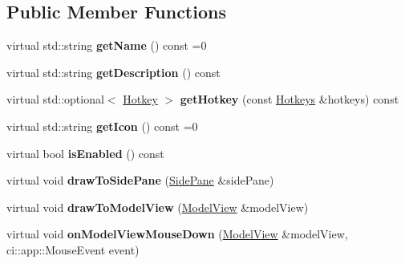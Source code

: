 \subsection*{Public Member Functions}
\begin{DoxyCompactItemize}
\item 
\mbox{\label{classpepr3d_1_1_tool_a5706faac1c122203317c60b3eb231d1a}} 
virtual std\+::string {\bfseries get\+Name} () const =0
\item 
\mbox{\label{classpepr3d_1_1_tool_a331bbb48707ea07c472b7634b02e1a18}} 
virtual std\+::string {\bfseries get\+Description} () const
\item 
\mbox{\label{classpepr3d_1_1_tool_a2b3b7279f6a942a99c11c9495b3a3d84}} 
virtual std\+::optional$<$ \mbox{\hyperlink{structpepr3d_1_1_hotkey}{Hotkey}} $>$ {\bfseries get\+Hotkey} (const \mbox{\hyperlink{classpepr3d_1_1_hotkeys}{Hotkeys}} \&hotkeys) const
\item 
\mbox{\label{classpepr3d_1_1_tool_a068b3420aff7edd507e3348c6d83c383}} 
virtual std\+::string {\bfseries get\+Icon} () const =0
\item 
\mbox{\label{classpepr3d_1_1_tool_aae323508b6d824047abc981e10a42c0f}} 
virtual bool {\bfseries is\+Enabled} () const
\item 
\mbox{\label{classpepr3d_1_1_tool_a07eac1be4dee577eec8c865390e8277d}} 
virtual void {\bfseries draw\+To\+Side\+Pane} (\mbox{\hyperlink{classpepr3d_1_1_side_pane}{Side\+Pane}} \&side\+Pane)
\item 
\mbox{\label{classpepr3d_1_1_tool_a7278925cff7d0da94e54f9bca201bda7}} 
virtual void {\bfseries draw\+To\+Model\+View} (\mbox{\hyperlink{classpepr3d_1_1_model_view}{Model\+View}} \&model\+View)
\item 
\mbox{\label{classpepr3d_1_1_tool_aaa49ecd05152b869571601c7741fc5ca}} 
virtual void {\bfseries on\+Model\+View\+Mouse\+Down} (\mbox{\hyperlink{classpepr3d_1_1_model_view}{Model\+View}} \&model\+View, ci\+::app\+::\+Mouse\+Event event)
\item 

\end{DoxyCompactItemize}
